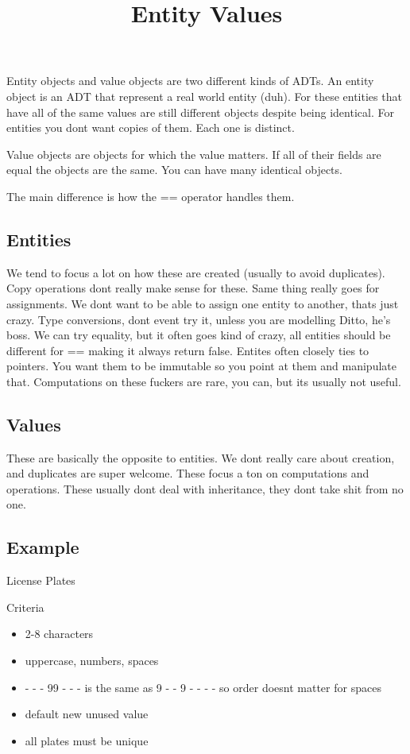 \documentclass[12pt]{article}
\begin{document}
\title{Entity Values}
Entity objects and value objects are two different kinds of ADTs. An entity object is an ADT that represent a real world entity (duh). For these entities that have all of the same values are still different objects despite being identical. For entities you dont want copies of them. Each one is distinct.

Value objects are objects for which the value matters. If all of their fields are equal the objects are the same. You can have many identical objects.

The main difference is how the == operator handles them.  

\subsection*{Entities}
We tend to focus a lot on how these are created (usually to avoid duplicates). Copy operations dont really make sense for these. Same thing really goes for assignments. We dont want to be able to assign one entity to another, thats just crazy. Type conversions, dont event try it, unless you are modelling Ditto, he's boss. We can try equality, but it often goes kind of crazy, all entities should be different for == making it always return false. Entites often closely ties to pointers. You want them to be immutable so you point at them and manipulate that. Computations on these fuckers are rare, you can, but its usually not useful. 

\subsection*{Values}
These are basically the opposite to entities. We dont really care about creation, and duplicates are super welcome. These focus a ton on computations and operations. These usually dont deal with inheritance, they dont take shit from no one.  

\subsection*{Example}
License Plates

Criteria
\begin{itemize}
\item 2-8 characters
\item uppercase, numbers, spaces
\item - - - 99 - - - is the same as 9 - - 9 - - - - so order doesnt matter for spaces
\item default new unused value
\item all plates must be unique
\end{itemize}
\end{document}
